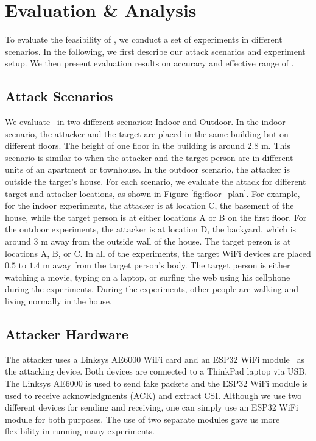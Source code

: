 \section{Evaluation \& Analysis}


To evaluate the feasibility of \wisneak, we conduct a set of experiments in different scenarios. In the following, we first describe our attack scenarios and experiment setup. We then present evaluation results on accuracy and effective range of \wisneak. 

\subsection{Attack Scenarios}
\label{sec:setup}
We evaluate \wisneak\ in two different scenarios: Indoor and Outdoor. In the indoor scenario, the attacker and the target are placed in the same building but on different floors. The height of one floor in the building is around $2.8$ m. 
This scenario is similar to when the attacker and the target person are in different units of an apartment or townhouse.
In the outdoor scenario, the attacker is outside the target's house. For each scenario, we evaluate the attack for different target and attacker locations, as shown in Figure \ref{fig:floor_plan}. For example, for the indoor experiments, the attacker is at location C, the basement of the house, while the target person is at either locations A or B on the first floor. For the outdoor experiments, the attacker is at location D, the backyard, which is around $3$ m away from the outside wall of the house. The target person is at locations A, B, or C. In all of the experiments, the target WiFi devices are placed $0.5$ to $1.4$ m away from the target person's body. The target person is either watching a movie, typing on a laptop, or surfing the web using his cellphone during the experiments. During the experiments, other people are walking and living normally in the house.


\subsection{Attacker Hardware}
The attacker uses a Linksys AE6000 WiFi card and an ESP32 WiFi module~\cite{esp32} as the attacking device. Both devices are connected to a ThinkPad laptop via USB. The Linksys AE6000 is used to send fake packets and the ESP32 WiFi module is used to receive acknowledgments (ACK) and extract CSI. Although we use two different devices for sending and receiving, one can simply use an ESP32 WiFi module for both purposes.
The use of two separate modules gave us more flexibility in running many experiments.

